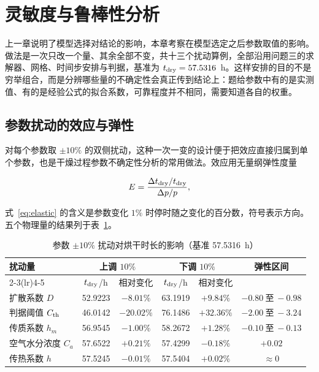 \section{灵敏度与鲁棒性分析}\label{sec:sens}

上一章说明了模型选择对结论的影响，本章考察在模型选定之后参数取值的影响。做法是一次只改一个量、其余全部不变，共十三个扰动算例，全部沿用问题三的求解器、网格、时间步安排与判据，基准为 $t_{\rm dry}=57.5316$~h。这样安排的目的不是穷举组合，而是分辨哪些量的不确定性会真正传到结论上：题给参数中有的是实测值、有的是经验公式的拟合系数，可靠程度并不相同，需要知道各自的权重。

\subsection{参数扰动的效应与弹性}

对每个参数取 $\pm10\%$ 的双侧扰动，这种一次一变的设计便于把效应直接归属到单个参数，也是干燥过程参数不确定性分析的常用做法。效应用无量纲弹性度量

\begin{equation}
E=\frac{\Delta t_{\rm dry}/t_{\rm dry}}{\Delta p/p},
\label{eq:elastic}
\end{equation}

式~\eqref{eq:elastic} 的含义是参数变化 $1\%$ 时停时随之变化的百分数，符号表示方向。五个物理量的结果列于表~\ref{tab:sens}。

\begin{table}[H]
\centering
\caption{参数 $\pm10\%$ 扰动对烘干时长的影响（基准 57.5316~h）}\label{tab:sens}
\begin{tabular}{lccccc}
\toprule
\multirow{2}{*}{扰动量} & \multicolumn{2}{c}{上调 $10\%$} & \multicolumn{2}{c}{下调 $10\%$} & \multirow{2}{*}{弹性区间} \\
\cmidrule(lr){2-3}\cmidrule(lr){4-5}
 & $t_{\rm dry}$/h & 相对变化 & $t_{\rm dry}$/h & 相对变化 & \\
\midrule
扩散系数 $D$        & 52.9223 & $-8.01\%$  & 63.1919 & $+9.84\%$  & $-0.80\ \text{至}\ -0.98$ \\
判据阈值 $C_{\rm th}$ & 46.0142 & $-20.02\%$ & 76.1486 & $+32.36\%$ & $-2.00\ \text{至}\ -3.24$ \\
传质系数 $h_m$      & 56.9545 & $-1.00\%$  & 58.2672 & $+1.28\%$  & $-0.10\ \text{至}\ -0.13$ \\
空气水分浓度 $C_a$   & 57.6522 & $+0.21\%$  & 57.4299 & $-0.18\%$  & $+0.02$ \\
传热系数 $h$        & 57.5245 & $-0.01\%$  & 57.5404 & $+0.02\%$  & $\approx 0$ \\
\bottomrule
\end{tabular}
\end{table}

